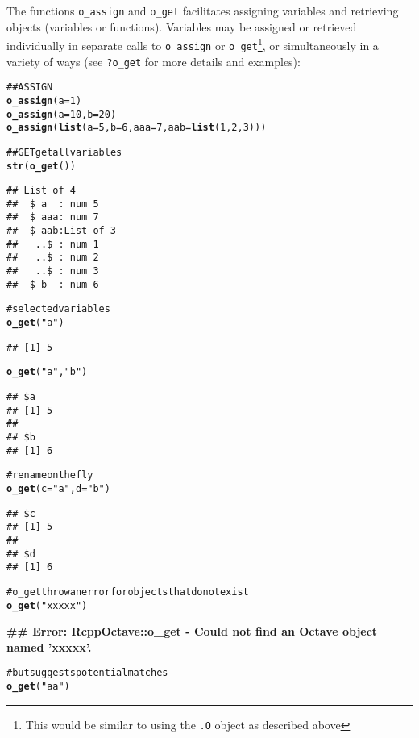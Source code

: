 \documentclass[english,10pt,a4paper]{article}\usepackage{graphicx, color}
\makeatletter
\newcommand{\hlfunctioncall}[1]{\textcolor[rgb]{0.501960784313725,0,0.329411764705882}{\textbf{#1}}}%
\newcommand{\hlstring}[1]{\textcolor[rgb]{0.6,0.6,1}{#1}}%
\newcommand{\hlcomment}[1]{\textcolor[rgb]{0.180392156862745,0.6,0.341176470588235}{#1}}%
\newenvironment{kframe}{%
 \def\at@end@of@kframe{}%
 \ifinner\ifhmode%
  \def\at@end@of@kframe{\end{minipage}}%
  \begin{minipage}{\columnwidth}%
 \fi\fi%
 \def\FrameCommand##1{\hskip\@totalleftmargin \hskip-\fboxsep
 \colorbox{shadecolor}{##1}\hskip-\fboxsep
     \hskip-\linewidth \hskip-\@totalleftmargin \hskip\columnwidth}%
 \MakeFramed {\advance\hsize-\width
   \@totalleftmargin\z@ \linewidth\hsize
   \@setminipage}}%
 {\par\unskip\endMakeFramed%
 \at@end@of@kframe}
\newenvironment{knitrout}{}{} %
\let\code=\texttt
\makeatother
\begin{document}
The functions \code{o\_assign} and \code{o\_get} facilitates assigning variables
and retrieving objects (variables or functions).
Variables may be assigned or retrieved individually in separate calls to
\code{o\_assign} or \code{o\_get}\footnote{This would be similar to using the
\code{.O} object as described above}, or simultaneously in a variety of ways
(see \code{?o\_get} for more details and examples):

\begin{knitrout}
\color{fgcolor}\begin{kframe}
\begin{alltt}
\hlcomment{## ASSIGN}
\hlfunctioncall{o_assign}(a = 1)
\hlfunctioncall{o_assign}(a = 10, b = 20)
\hlfunctioncall{o_assign}(\hlfunctioncall{list}(a = 5, b = 6, aaa = 7, aab = \hlfunctioncall{list}(1, 2, 3)))

\hlcomment{## GET get all variables}
\hlfunctioncall{str}(\hlfunctioncall{o_get}())
\end{alltt}
\begin{verbatim}
## List of 4
##  $ a  : num 5
##  $ aaa: num 7
##  $ aab:List of 3
##   ..$ : num 1
##   ..$ : num 2
##   ..$ : num 3
##  $ b  : num 6
\end{verbatim}
\begin{alltt}
\hlcomment{# selected variables}
\hlfunctioncall{o_get}(\hlstring{"a"})
\end{alltt}
\begin{verbatim}
## [1] 5
\end{verbatim}
\begin{alltt}
\hlfunctioncall{o_get}(\hlstring{"a"}, \hlstring{"b"})
\end{alltt}
\begin{verbatim}
## $a
## [1] 5
## 
## $b
## [1] 6
\end{verbatim}
\begin{alltt}
\hlcomment{# rename on the fly}
\hlfunctioncall{o_get}(c = \hlstring{"a"}, d = \hlstring{"b"})
\end{alltt}
\begin{verbatim}
## $c
## [1] 5
## 
## $d
## [1] 6
\end{verbatim}
\begin{alltt}
\hlcomment{# o_get throw an error for objects that do not exist}
\hlfunctioncall{o_get}(\hlstring{"xxxxx"})
\end{alltt}


{\ttfamily\noindent\bfseries\textcolor{errorcolor}{\#\# Error: RcppOctave::o\_get - Could not find an Octave object named 'xxxxx'.}}\begin{alltt}
\hlcomment{# but suggests potential matches}
\hlfunctioncall{o_get}(\hlstring{"aa"})
\end{alltt}



\end{kframe}
\end{knitrout}
\end{document}
